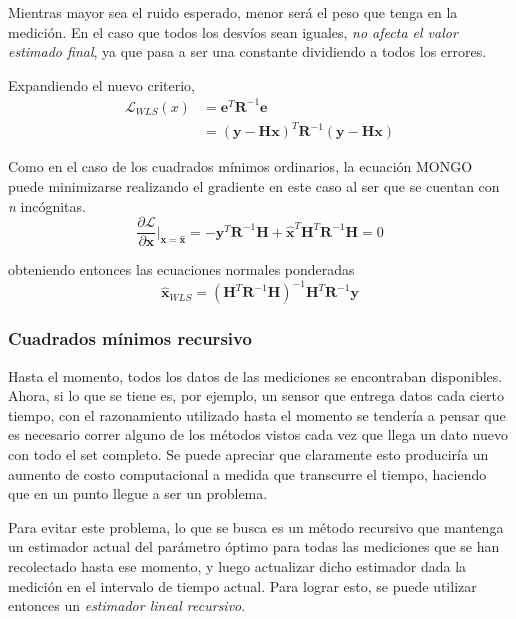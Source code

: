 Mientras mayor sea el ruido esperado, menor será el peso que tenga en la medición. En el caso que todos los desvíos sean iguales, \textit{no afecta el valor estimado final}, ya que pasa a ser una constante dividiendo a todos los errores.

Expandiendo el nuevo criterio,
\begin{align}
    \mathscr{L}_{WLS}(x) &= \bm{e}^T\bm{R}^{-1}\bm{e} \\
                         &= (\bm{y} - \bm{H}\bm{x})^T\bm{R}^{-1}(\bm{y}-\bm{H}\bm{x})
\end{align}

Como en el caso de los cuadrados mínimos ordinarios, la ecuación MONGO puede minimizarse realizando el gradiente en este caso al ser que se cuentan con \textit{n} incógnitas.
\begin{equation}
    \frac{\partial \mathscr{L}}{\partial \bm{x}}\bigg\rvert_{\bm{x}=\hat{\bm{x}}} = -\bm{y}^T\bm{R}^{-1}\bm{H} + \hat{\bm{x}}^T\bm{H}^T\bm{R}^{-1}\bm{H} = 0
\end{equation}

obteniendo entonces las ecuaciones normales ponderadas
\begin{equation}
    \hat{\bm{x}}_{WLS} = (\bm{H}^T\bm{R}^{-1}\bm{H})^{-1} \bm{H}^T\bm{R}^{-1}\bm{y}
\end{equation}

\subsubsection{Cuadrados mínimos recursivo}

Hasta el momento, todos los datos de las mediciones se encontraban disponibles. Ahora, si lo que se tiene es, por ejemplo, un sensor que entrega datos cada cierto tiempo, con el razonamiento utilizado hasta el momento se tendería a pensar que es necesario correr alguno de los métodos vistos cada vez que llega un dato nuevo con todo el set completo. Se puede apreciar que claramente esto produciría un aumento de costo computacional a medida que transcurre el tiempo, haciendo que en un punto llegue a ser un problema.

Para evitar este problema, lo que se busca es un método recursivo que mantenga un estimador actual del parámetro óptimo para todas las mediciones que se han recolectado hasta ese momento, y luego actualizar dicho estimador dada la medición en el intervalo de tiempo actual. Para lograr esto, se puede utilizar entonces un \textit{estimador lineal recursivo}.

